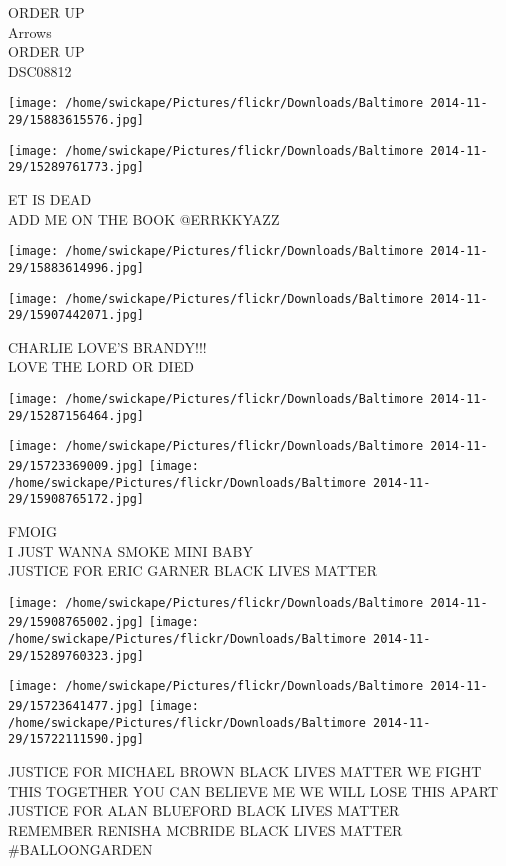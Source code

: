 \documentclass[10pt,letterpaper]{article}
\begin{document}
ORDER UP\\
Arrows\\
ORDER UP\\
DSC08812\\
\pagebreak

\texttt{[image: /home/swickape/Pictures/flickr/Downloads/Baltimore 2014-11-29/15883615576.jpg]}

\vspace{0.25in}
\texttt{[image: /home/swickape/Pictures/flickr/Downloads/Baltimore 2014-11-29/15289761773.jpg]}

ET IS DEAD\\
ADD ME ON THE BOOK @ERRKKYAZZ\\
\pagebreak

\texttt{[image: /home/swickape/Pictures/flickr/Downloads/Baltimore 2014-11-29/15883614996.jpg]}

\vspace{0.25in}
\texttt{[image: /home/swickape/Pictures/flickr/Downloads/Baltimore 2014-11-29/15907442071.jpg]}

CHARLIE LOVE'S BRANDY!!!\\
LOVE THE LORD OR DIED\\
\pagebreak

\texttt{[image: /home/swickape/Pictures/flickr/Downloads/Baltimore 2014-11-29/15287156464.jpg]}

\vspace{0.25in}
\texttt{[image: /home/swickape/Pictures/flickr/Downloads/Baltimore 2014-11-29/15723369009.jpg]}
\texttt{[image: /home/swickape/Pictures/flickr/Downloads/Baltimore 2014-11-29/15908765172.jpg]}

FMOIG\\
I JUST WANNA SMOKE MINI BABY\\
JUSTICE FOR ERIC GARNER BLACK LIVES MATTER\\
\pagebreak

\texttt{[image: /home/swickape/Pictures/flickr/Downloads/Baltimore 2014-11-29/15908765002.jpg]}
\texttt{[image: /home/swickape/Pictures/flickr/Downloads/Baltimore 2014-11-29/15289760323.jpg]}

\texttt{[image: /home/swickape/Pictures/flickr/Downloads/Baltimore 2014-11-29/15723641477.jpg]}
\texttt{[image: /home/swickape/Pictures/flickr/Downloads/Baltimore 2014-11-29/15722111590.jpg]}

JUSTICE FOR MICHAEL BROWN BLACK LIVES MATTER WE FIGHT THIS TOGETHER YOU CAN BELIEVE ME WE WILL LOSE THIS APART\\
JUSTICE FOR ALAN BLUEFORD BLACK LIVES MATTER\\
REMEMBER RENISHA MCBRIDE BLACK LIVES MATTER\\
\#BALLOONGARDEN\\
\pagebreak
\end{document}
